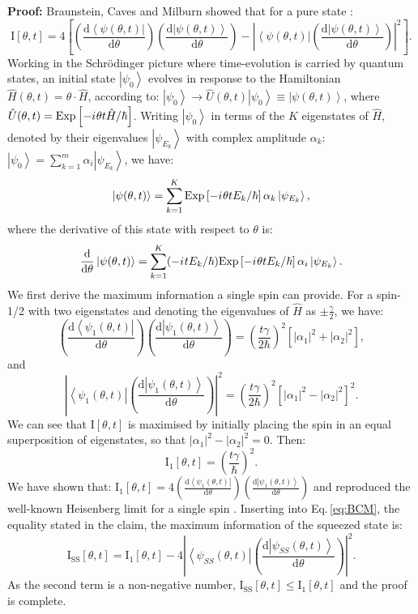 \documentclass[reqno]{amsart}
\def\be{\begin{equation}}
\def\ee{\end{equation}}
\newcommand{\ket}[1]{\left| #1 \right>}
\newcommand{\bra}[1]{\left< #1 \right|}
\newcommand{\hham}{\hat{H}}
\newcommand{\U}{\hat{U}}
\newcommand{\iu}{{i\mkern1mu}}
\def\func#1#2{\mathrm{#1}\left[#2\right]}
\def\funcwrt#1#2#3{\mathrm{#1}_{\mathrm{#3}}\left[#2\right]}
\begin{document}
\textbf{Proof:} Braunstein, Caves and Milburn showed that for a pure state \cite{Braunstein1996}:
\be
\func{I}{\theta,t} = 4\left[\left(\frac{\mathrm{d}\bra{\psi(\theta,t)}}{\mathrm{d} \theta}\right)\left(\frac{\mathrm{d}\ket{\psi(\theta,t)}}{\mathrm{d} \theta}\right) - \left|\bra{\psi(\theta,t)}\left(\frac{\mathrm{d}\ket{\psi(\theta,t)}}{\mathrm{d} \theta}\right)\right|^2\right].
\label{eq:BCM}
\ee
Working in the Schr\"odinger picture where time-evolution is carried by quantum states, an initial state $\ket{\psi_0}$ evolves in response to the Hamiltonian $\hham(\theta,t) = \theta \cdot \hham$, according to: $\ket{\psi_0} \rightarrow \U(\theta, t)\ket{\psi_0} \equiv \ket{\psi(\theta,t)}$, where $\U(\theta,t) = \func{Exp}{-\iu \theta t \hham /\hbar}$. Writing $\ket{\psi_0}$ in terms of the $K$ eigenstates of $\hham$, denoted by their eigenvalues $\ket{\psi_{E_k}}$ with complex amplitude $\alpha_k$: $\ket{\psi_0} = \sum_{k = 1}^m \alpha_i \ket{\psi_{E_k}}$, we have:
\[ \ket{\psi(\theta,t)} = \sum_{k = 1}^K \func{Exp}{-\iu \theta t E_k/\hbar}\alpha_k \ket{\psi_{E_k}}, \]
where the derivative of this state with respect to $\theta$ is:
\[ \frac{\mathrm{d}}{\mathrm{d}\theta}\ket{\psi(\theta,t)} = \sum_{k = 1}^K (-\iu t E_k/\hbar) \func{Exp}{-\iu \theta t E_k/\hbar}\alpha_i \ket{\psi_{E_k}}.\]
We first derive the maximum information a single spin can provide. For a spin-1/2 with two eigenstates and denoting the eigenvalues of $\hham$ as $\pm \frac{\gamma}{2}$, we have:
\[ \left(\frac{\mathrm{d}\bra{\psi_1(\theta,t)}}{\mathrm{d} \theta}\right)\left(\frac{\mathrm{d}\ket{\psi_1(\theta,t)}}{\mathrm{d} \theta}\right) = \left(\frac{t \gamma}{2\hbar}\right)^2 \left[ |\alpha_1|^2 + |\alpha_2|^2 \right], \]
and
\[ \left|\bra{\psi_1(\theta,t)}\left(\frac{\mathrm{d}\ket{\psi_1(\theta,t)}}{\mathrm{d} \theta}\right)\right|^2 = \left(\frac{t \gamma}{2 \hbar}\right)^2 \left[ |\alpha_1|^2 - |\alpha_2|^2 \right]^2.\]
We can see that $\func{I}{\theta,t}$ is maximised by initially placing the spin in an equal superposition of eigenstates, so that $|\alpha_1|^2 - |\alpha_2|^2 = 0$. Then: 
\[\funcwrt{I}{\theta,t}{1} = \left(\frac{t \gamma}{\hbar}\right)^2.\]
We have shown that: $\funcwrt{I}{\theta,t}{1} = 4\left(\frac{\mathrm{d}\bra{\psi_1(\theta,t)}}{\mathrm{d} \theta}\right)\left(\frac{\mathrm{d}\ket{\psi_1(\theta,t)}}{\mathrm{d} \theta}\right)$ and reproduced the well-known Heisenberg limit for a single spin \cite{Bollinger1996, Giovannetti2004, Pang2014}. Inserting into Eq.\,\eqref{eq:BCM}, the equality stated in the claim, the maximum information of the squeezed state is:
\[%
\funcwrt{I}{\theta,t}{SS} = \funcwrt{I}{\theta,t}{1} - 4\left|\bra{\psi_{SS}(\theta,t)}\left(\frac{\mathrm{d}\ket{\psi_{SS}(\theta,t)}}{\mathrm{d} \theta}\right)\right|^2.
\]%
As the second term is a non-negative number, $\funcwrt{I}{\theta,t}{SS} \leq \funcwrt{I}{\theta,t}{1}$ and the proof is complete.
\end{document}
